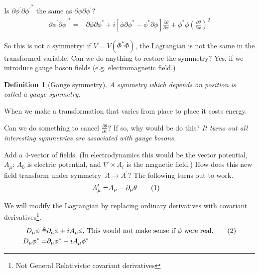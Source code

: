 \documentclass[]{article}
\newcommand\numberthis{\addtocounter{equation}{1}\tag{\theequation}}
\newtheorem{defn}[thm]{Definition}
\begin{document}
Is $\partial \phi^\prime \partial {\phi^\prime}^*$ the same as $\partial \phi \partial {\phi^\prime}$?
\begin{align*}
\partial \phi^\prime \partial {\phi^\prime}^* =&\partial \phi \partial \phi^* + i[\phi \partial \phi^* -\phi^* \partial \phi]\frac{\partial \theta}{\partial x} + \phi^* \phi (\frac{\partial \theta}{\partial x})^2
\end{align*}

So this is not a symmetry: if $V=V(\Phi^*\Phi)$, the Lagrangian is not the same in the transformed variable.  Can we do anything to restore the symmetry? Yes, if we introduce gauge boson fields (e.g. electromagnetic field.)

\begin{defn}[Gauge symmetry]
	A symmetry which depends on position is called a gauge symmetry.
\end{defn}

When we make a transformation that varies from place to place it costs energy.

Can we do something to cancel $\frac{\partial \theta}{\partial x}$? If so, why would be do this? \emph{It turns out all interesting symmetries are associated with gauge bosons.}

Add a 4-vector of fields. (In electrodynamics this would be the vector potential, $A_\mu$: $A_0$ is electric potential, and $\nabla \times A_i$ is the magnetic field.) How does this new field transform under symmetry--$A \rightarrow A^\prime$? The following turns out to work.
\begin{align*}
	A^\prime_\mu =& A_\mu - \partial_\mu \theta \numberthis \label{eq:gauge:field}
\end{align*}

We will modify the Lagrangian by replacing ordinary derivatives with covariant derivatives\footnote{Not General Relativistic covariant derivatives}.
\begin{align*}
	D_\mu \phi \triangleq& \partial_\mu \phi + i A_\mu \phi \text{, This would not make sense if $\phi$ were real.} \numberthis \label{eq:covariant:derivative}\\
	D_\mu \phi^* =& \partial_\mu \phi^* - i A_\mu \phi^*
\end{align*}
\end{document}
